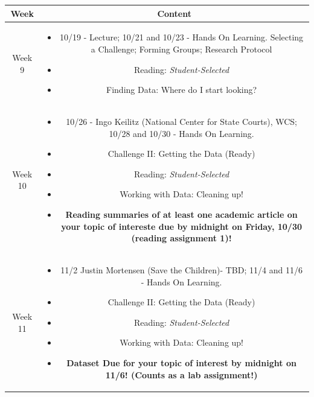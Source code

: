 \documentclass[11pt]{article}
\begin{document}
\begin{table}[h!]
\small %
\begin{tabular}{ | c | c | }
\hline
\textbf{Week} & \textbf{Content} \\
\hline

Week 9 & \begin{minipage}{.85\textwidth}
\begin{itemize} \itemsep-0.4em
	\vspace{1mm}
	\item 10/19 - Lecture; 10/21 and 10/23 - Hands On Learning.
	Selecting a Challenge; Forming Groups; Research Protocol
	\item Reading: \textit{Student-Selected}
	\item Finding Data: Where do I start looking?
	\vspace{1mm}
\end{itemize}
\end{minipage} \\
\hline

Week 10 & \begin{minipage}{.85\textwidth}
\begin{itemize} \itemsep-0.4em
	\vspace{1mm}
	\item 10/26 - Ingo Keilitz (National Center for State Courts), WCS; 10/28 and 10/30 - Hands On Learning.
	\item Challenge II: Getting the Data (Ready)
	\item Reading: \textit{Student-Selected}
	\item Working with Data: Cleaning up!
	\item \textbf{Reading summaries of at least one academic article on your topic of intereste due by midnight on Friday, 10/30 (reading assignment 1)!}
	\vspace{1mm}
\end{itemize}
\end{minipage} \\
\hline

Week 11 & \begin{minipage}{.85\textwidth}
\begin{itemize} \itemsep-0.4em
	\vspace{1mm}
	\item 11/2 Justin Mortensen (Save the Children)- TBD; 11/4 and 11/6 - Hands On Learning.
	\item Challenge II: Getting the Data (Ready)
	\item Reading: \textit{Student-Selected}
	\item Working with Data: Cleaning up!
	\item \textbf{Dataset Due for your topic of interest by midnight on 11/6! (Counts as a lab assignment!)}
	\vspace{1mm}
\end{itemize}
\end{minipage} \\
\hline


\end{tabular}
\end{table}
\end{document}
